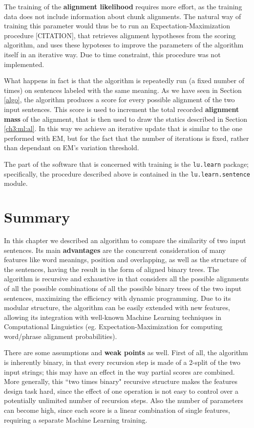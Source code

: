 The training of the \textbf{alignment likelihood} requires more effort, as the training data does not include information about chunk alignments. The natural way of training this parameter would thus be to run an Expectation-Maximization procedure [CITATION], that retrieves alignment hypotheses from the scoring algorithm, and uses these hypoteses to improve the parameters of the algorithm itself in an iterative way. Due to time constraint, this procedure was not implemented.

What happens in fact is that the algorithm is repeatedly run (a fixed number of times) on sentences labeled with the same meaning. As we have seen in Section \ref{algo}, the algorithm produces a score for every possible alignment of the two input sentences. This score is used to increment the total recorded \textbf{alignment mass} of the alignment, that is then used to draw the statics described in Section \ref{ch3:ml:al}. In this way we achieve an iterative update that is similar to the one performed with EM, but for the fact that the number of iterations is fixed, rather than dependant on EM's variation threshold.

The part of the software that is concerned with training is the \texttt{lu.learn} package; specifically, the procedure described above is contained in the \texttt{lu.learn.sentence} module.

\section{Summary} \label{conclusions}
In this chapter we described an algorithm to compare the similarity of two input sentences. Its main \textbf{advantages} are the concurrent consideration of many features like word meanings, position and overlapping, as well as the structure of the sentences, having the result in the form of aligned binary trees. The algorithm is recursive and exhaustive in that considers all the possible alignments of all the possible combinations of all the possible binary trees of the two input sentences, maximizing the efficiency with dynamic programming. Due to its modular structure, the algorithm can be easily extended with new features, allowing its integration with well-known Machine Learning techniques in Computational Linguistics (eg. Expectation-Maximization for computing word/phrase alignment probabilities).

There are some assumptions and \textbf{weak points} as well. First of all, the algorithm is inherently binary, in that every recursion step is made of a 2-split of the two input strings; this may have an effect in the way partial scores are combined. More generally, this ``two times binary" recursive structure makes the features design task hard, since the effect of one operation is not easy to control over a potentially unlimited number of recursion steps. Also the number of parameters can become high, since each score is a linear combination of single features, requiring a separate Machine Learning training.

